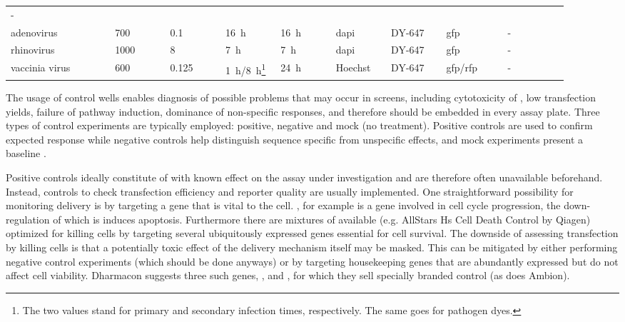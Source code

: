 \begin{table}
\begin{minipage}{\textwidth}
\begin{tabular}{L{0.17\linewidth}C{0.09\linewidth}C{0.09\linewidth}C{0.09\linewidth}C{0.09\linewidth}C{0.09\linewidth}C{0.09\linewidth}C{0.10\linewidth}C{0.10\linewidth}}
      - \\
    adenovirus &
      700 &
      0.1 &
      \SI{16}{\hour} &
      \SI{16}{\hour} &
      \acrshort{dapi} &
      DY-647 &
      \acrshort{gfp} &
      - \\
    rhinovirus &
      1000 &
      8 &
      \SI{7}{\hour} &
      \SI{7}{\hour} &
      \acrshort{dapi} &
      DY-647 &
      \acrshort{gfp} &
      - \\
    vaccinia virus &
      600 &
      0.125 &
      \SI{1}{\hour}\slash \SI{8}{\hour}\footnote{The two values stand for primary and secondary infection times, respectively. The same goes for pathogen dyes.} &
      \SI{24}{\hour} &
      Hoechst &
      DY-647 &
      \acrshort{gfp}\slash \acrshort{rfp} &
      - \\
  \end{tabular}
  \end{minipage}
\end{table}

The usage of control wells enables diagnosis of possible problems that may occur in  screens, including cytotoxicity of , low transfection yields, failure of  pathway induction, dominance of non-specific responses, and therefore should be embedded in every assay plate. Three types of control experiments are typically employed: positive, negative and mock (no  treatment). Positive controls are used to confirm expected response while negative controls help distinguish sequence specific from unspecific effects, and mock experiments present a baseline \citep{Sittampalam2004}.

Positive controls ideally constitute of  with known effect on the assay under investigation and are therefore often unavailable beforehand. Instead, controls to check transfection efficiency and reporter quality are usually implemented. One straightforward possibility for monitoring delivery is by targeting a gene that is vital to the cell. , for example is a gene involved in cell cycle progression, the down-regulation of which is induces apoptosis. Furthermore there are mixtures of  available (e.g. AllStars Hs Cell Death Control  by Qiagen) optimized for killing cells by targeting several ubiquitously expressed genes essential for cell survival. The downside of assessing transfection by killing cells is that a potentially toxic effect of the delivery mechanism itself may be masked. This can be mitigated by either performing negative control experiments (which should be done anyways) or by targeting housekeeping genes that are abundantly expressed but do not affect cell viability. Dharmacon suggests three such genes, ,  and , for which they sell specially branded control  (as does Ambion).


